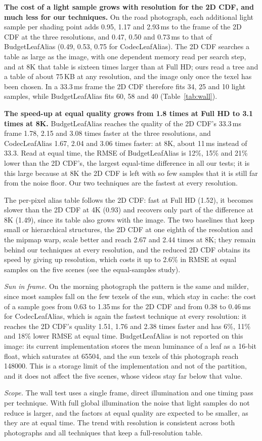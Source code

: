 \documentclass[10pt]{article}
\begin{document}
\textbf{The cost of a light sample grows with resolution for the 2D CDF, and much less for our techniques.} On the road photograph, each additional light sample per shading point adds 0.95, 1.17 and 2.93\,ms to the frame of the 2D CDF at the three resolutions, and 0.47, 0.50 and 0.73\,ms to that of BudgetLeafAlias (0.49, 0.53, 0.75 for CodecLeafAlias). The 2D CDF searches a table as large as the image, with one dependent memory read per search step, and at 8K that table is sixteen times larger than at Full HD; ours read a tree and a table of about 75\,KB at any resolution, and the image only once the texel has been chosen. In a 33.3\,ms frame the 2D CDF therefore fits 34, 25 and 10 light samples, while BudgetLeafAlias fits 60, 58 and 40 (Table~\ref{tab:wall}).

\textbf{The speed-up at equal quality grows from 1.8 times at Full HD to 3.1 times at 8K.} BudgetLeafAlias reaches the quality of the 2D CDF's 33.3\,ms frame 1.78, 2.15 and 3.08 times faster at the three resolutions, and CodecLeafAlias 1.67, 2.04 and 3.06 times faster: at 8K, about 11\,ms instead of 33.3. Read at equal time, the RMSE of BudgetLeafAlias is 12\%, 15\% and 21\% lower than the 2D CDF's, the largest equal-time difference in all our tests; it is this large because at 8K the 2D CDF is left with so few samples that it is still far from the noise floor. Our two techniques are the fastest at every resolution.

The per-pixel alias table follows the 2D CDF: fast at Full HD (1.52), it becomes slower than the 2D CDF at 4K (0.93) and recovers only part of the difference at 8K (1.49), since its table also grows with the image. The two baselines that keep small or hierarchical structures, the 2D CDF at one eighth of the resolution and the mipmap warp, scale better and reach 2.67 and 2.44 times at 8K; they remain behind our techniques at every resolution, and the reduced 2D CDF obtains its speed by giving up resolution, which costs it up to 2.6\% in RMSE at equal samples on the five scenes (see the equal-samples study).

\emph{Sun in frame.} On the morning photograph the pattern is the same and milder, since most samples fall on the few texels of the sun, which stay in cache: the cost of a sample goes from 0.63 to 1.35\,ms for the 2D CDF and from 0.38 to 0.46\,ms for CodecLeafAlias, which is again the fastest technique at every resolution: it reaches the 2D CDF's quality 1.51, 1.76 and 2.38 times faster and has 6\%, 11\% and 18\% lower RMSE at equal time. BudgetLeafAlias is not reported on this image: its current implementation stores the mean luminance of a leaf as a 16-bit float, which saturates at 65504, and the sun texels of this photograph reach 148000. This is a storage limit of the implementation and not of the partition, and it does not affect the five scenes, whose videos stay far below that value.

\emph{Scope.} The wall test uses a single frame, direct illumination and one timing pass per technique. With full global illumination the noise that light samples do not reduce is larger, and the factors at equal quality are expected to be smaller, as they are at equal time. The trend with resolution is consistent across both photographs and all techniques that keep a full-resolution table.
\end{document}
